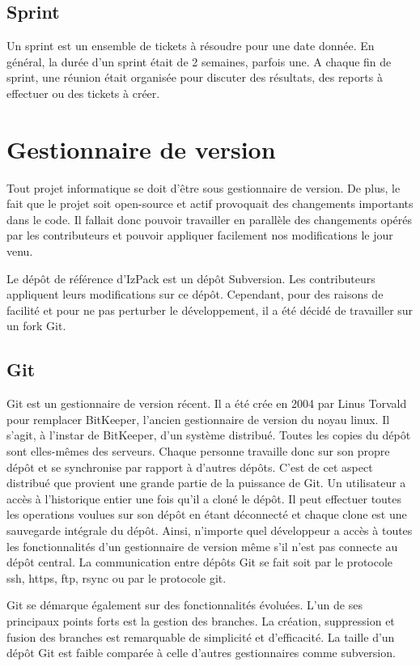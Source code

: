 \subsection{Sprint}
Un sprint est un ensemble de tickets à résoudre pour une date donnée.
En général, la durée d'un sprint était de 2 semaines, parfois une.
A chaque fin de sprint, une réunion était organisée pour discuter des résultats, des reports à effectuer ou des tickets à créer.
\section{Gestionnaire de version}
Tout projet informatique se doit d'être sous gestionnaire de version.
De plus, le fait que le projet soit open-source et actif provoquait des changements importants dans le code.
Il fallait donc pouvoir travailler en parallèle des changements opérés par les contributeurs et pouvoir appliquer facilement nos modifications le jour venu.

Le dépôt de référence d'IzPack est un dépôt Subversion.
Les contributeurs appliquent leurs modifications sur ce dépôt.
Cependant, pour des raisons de facilité et pour ne pas perturber le développement, il a été décidé de travailler sur un fork Git.
\subsection{Git}
Git est un gestionnaire de version récent. Il a été crée en 2004 par Linus Torvald pour remplacer BitKeeper, l'ancien gestionnaire de version du noyau linux.
Il s'agit, à l'instar de BitKeeper, d'un système distribué.
Toutes les copies du dépôt sont elles-mêmes des serveurs.
Chaque personne travaille donc sur son propre dépôt et se synchronise par rapport à d'autres dépôts.
C'est de cet aspect distribué que provient une grande partie de la puissance de Git.
Un utilisateur a accès à l'historique entier une fois qu'il a cloné le dépôt.
Il peut effectuer toutes les operations voulues sur son dépôt en étant déconnecté et chaque clone est une sauvegarde intégrale du dépôt.
Ainsi, n'importe quel développeur a accès à toutes les fonctionnalités d'un gestionnaire de version même s'il n'est pas connecte au dépôt central.
La communication entre dépôts Git se fait soit par le protocole ssh, https, ftp, rsync ou par le protocole git.

Git se démarque également sur des fonctionnalités évoluées. L'un de ses principaux points forts est la gestion des branches. La création, suppression et fusion des branches est remarquable de simplicité et d'efficacité.
La taille d'un dépôt Git est faible comparée à celle d'autres gestionnaires comme subversion.


